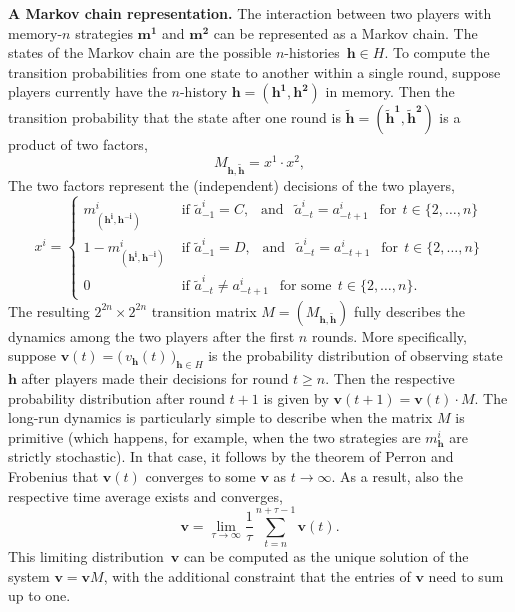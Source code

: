 \documentclass[11pt]{article}
\theoremstyle{plainCl1}
\theoremstyle{plainCl2}
\begin{document}

\noindent
{\bf A Markov chain representation.}
The interaction between two players with memory-\(n\) strategies \(\mathbf{m^{1}}\) and \(\mathbf{m^{2}}\) can be represented as a Markov chain. 
The states of the Markov chain are the possible $n$-histories~$\mathbf{h}\!\in\!H$. 
To compute the transition probabilities from one state to another within a single round, suppose  players currently have the $n$-history \(\mathbf{h}\!=\!(\mathbf{h^1}, \mathbf{h^2})\) in memory.
Then the transition probability that the state after one round is $\mathbf{\tilde h}\!=\!(\mathbf{\tilde h^1},\mathbf{\tilde h^2})$ is a product of two factors,
\begin{equation}\label{Eq:TransitionMatrix}
M_{\mathbf{h}, \mathbf{\tilde h}} = x^1 \cdot x^2,
\end{equation}
The two factors represent the (independent) decisions of the two players,
\begin{equation}
x^i = \left\{
\begin{array}{ll}
  m^{i}_{(\mathbf{h^i},\mathbf{h^{-i}})} & \text{ if } \tilde{a}^i_{-1} \!=\! C, ~~\text{ and }~~ \tilde a^i_{-t} \!=\! a^i_{-t + 1} ~~\text{ for}~~t\!\in\!\{2,\ldots,n\}\\[0.1cm]
  1 \!-\! m^{i}_{(\mathbf{h^i},\mathbf{h^{-i}})} & \text{ if } \tilde{a}^i_{-1} \!=\! D, ~~\text{ and }~~ \tilde a^i_{-t} \!=\! a^i_{-t + 1} ~~\text{ for}~~t\!\in\!\{2,\ldots,n\}\\[0.1cm]
  0 & \text{ if } \tilde a^i_{-t} \neq  a^i_{-t + 1}~~\text{ for some}~~t\!\in\!\{2,\ldots,n\}.
\end{array}
\right.
\end{equation}
The resulting  \(2^{2n} \times 2^{2n}\) transition matrix $M\!=\!(M_{\mathbf{h},\mathbf{\tilde h}})$ fully describes the dynamics among the two players after the first $n$ rounds. 
More specifically, suppose $\mathbf{v}(t) \!=\! \big(\,v_\mathbf{h}(t)\,\big)_{\mathbf{h}\in H}$ is the probability distribution of observing state~$\mathbf{h}$ after players made their decisions for round $t\!\ge\!n$.
Then the respective probability distribution after round $t\!+\!1$ is given by $\mathbf{v}(t\!+\!1) \!=\! \mathbf{v}(t)\cdot M$. 
The long-run dynamics is particularly simple to describe when the matrix $M$ is primitive (which happens, for example, when the two strategies are $m^i_\mathbf{h}$ are strictly stochastic). 
In that case, it follows by the theorem of Perron and Frobenius that $\mathbf{v}(t)$ converges to some $\mathbf{v}$ as $t\to \infty$. 
As a result, also the respective time average exists and converges, 
\begin{equation} \label{Eq:TimeAverage}
\mathbf{v} = \lim_{\tau\to\infty} \frac{1}{\tau} \sum_{t=n}^{n+\tau-1} \mathbf{v}(t).  
\end{equation}
This limiting distribution~$\mathbf{v}$ can be computed as the unique solution of the system $\mathbf{v} \!=\! \mathbf{v}M$, with the additional constraint that the entries of $\mathbf{v}$ need to sum up to one. 
\end{document}
